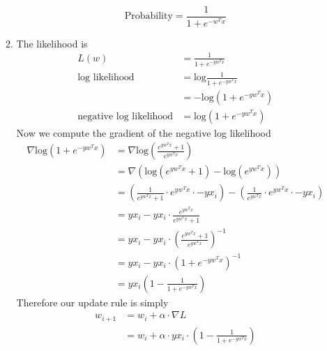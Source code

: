\documentclass{article}
\begin{document}
\begin{enumerate}
\begin{enumerate}
                \begin{equation*}
                    \text{Probability} = \frac{1}{1 + e^{-w^Tx}}
                \end{equation*}
            \item %
                The likelihood is
                \begin{align*}
                    L(w) 
                        &= \frac{1}{1 + e^{-yw^Tx}} \\
                    \text{log likelihood} 
                        &= \text{log}\frac{1}{1 + e^{-yw^Tx}} \\
                        &= -\text{log} (1 + e^{-yw^Tx}) \\
                    \text{negative log likelihood}
                        &= \text{log} (1 + e^{-yw^Tx})
                \end{align*}
                Now we compute the gradient of the negative log likelihood
                \begin{align*}
                    \nabla \text{log} (1 + e^{-yw^Tx})
                        &= \nabla \text{log} \left( \frac{e^{yw^Tx} + 1}
                            {e^{yw^Tx}} \right) \\
                        &= \nabla \left( \text{log}(e^{yw^Tx} + 1) -
                            \text{log}(e^{yw^Tx}) \right) \\
                        &= \left( \frac{1}{e^{yw^Tx} + 1} \cdot e^{yw^Tx}
                            \cdot -yx_i \right) - \left( 
                            \frac{1}{e^{yw^Tx}} \cdot e^{yw^Tx} \cdot 
                            -yx_i \right) \\
                        &= yx_i - yx_i \cdot \frac{e^{yw^Tx}}
                            {e^{yw^Tx}+1} \\
                        &= yx_i - yx_i \cdot \left( \frac{e^{yw^Tx}+1}
                            {e^{yw^Tx}} \right)^{-1} \\
                        &= yx_i - yx_i \cdot (1 + e^{-yw^Tx})^{-1} \\
                        &= yx_i \left( 1 - \frac{1}{1 + e^{-yw^Tx}} \right)
                \end{align*}
                Therefore our update rule is simply
                \begin{align*}
                    w_{i+1} 
                        &= w_i + \alpha \cdot \nabla L \\
                        &= w_i + \alpha \cdot yx_i \cdot \left( 1 - 
                            \frac{1}{1 + e^{-yw^Tx}} \right)
                \end{align*}
        \end{enumerate}
\end{enumerate}
\end{document}
